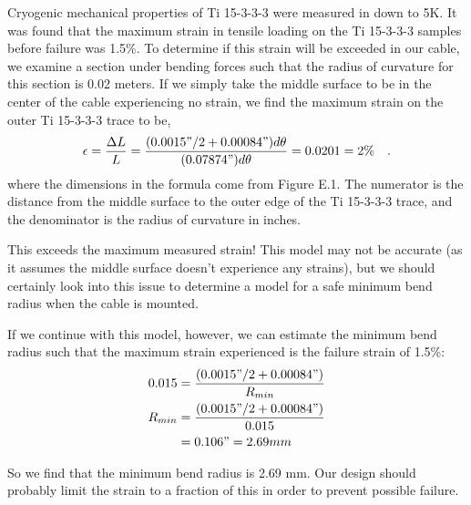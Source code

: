 \documentclass{report}
\begin{document}
\begin{appendices}
Cryogenic mechanical properties of Ti 15-3-3-3 were measured in \cite{James2012} down to 5K. It was found that the maximum strain in tensile loading on the Ti 15-3-3-3 samples before failure was 1.5\%. To determine if this strain will be exceeded in our cable, we examine a section under bending forces such that the radius of curvature for this section is 0.02 meters. If we simply take the middle surface to be in the center of the cable experiencing no strain, we find the maximum strain on the outer Ti 15-3-3-3 trace to be,
\begin{eqnarray}
\epsilon = \frac{\Delta L}{L} = \frac{(0.0015"/2 + 0.00084")d\theta}{(0.07874")d\theta} = 0.0201 = 2\% \ \ \ .
\end{eqnarray}
where the dimensions in the formula come from Figure E.1. The numerator is the distance from the middle surface to the outer edge of the Ti 15-3-3-3 trace, and the denominator is the radius of curvature in inches.

This exceeds the maximum measured strain! This model may not be accurate (as it assumes the middle surface doesn't experience any strains), but we should certainly look into this issue to determine a model for a safe minimum bend radius when the cable is mounted.

If we continue with this model, however, we can estimate the minimum bend radius such that the maximum strain experienced is the failure strain of 1.5\%:
\begin{eqnarray}
0.015 & = \frac{(0.0015"/2 + 0.00084")}{R_{min}} \\
 R_{min} & = \frac{(0.0015"/2 + 0.00084")}{0.015} \\
   & = 0.106" = 2.69 mm
\end{eqnarray}

So we find that the minimum bend radius is 2.69 mm. Our design should probably limit the strain to a fraction of this in order to prevent possible failure.

\end{appendices}
\end{document}
